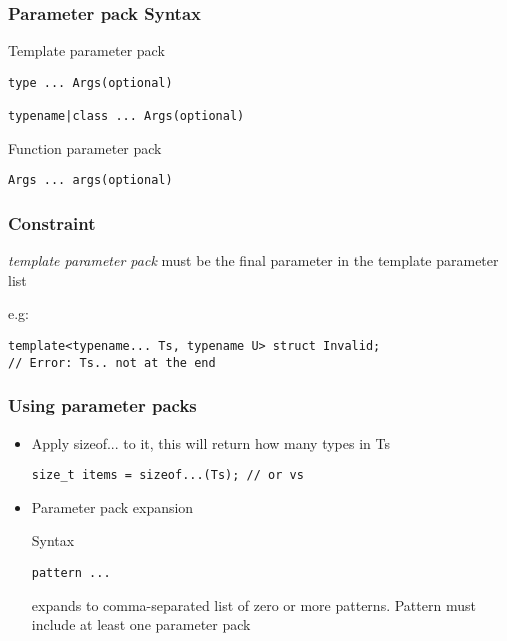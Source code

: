\documentclass{beamer}
\begin{document}
\begin{frame}[fragile]
\frametitle{Parameter pack Syntax}

\begin{block} {Template parameter pack}
\begin{lstlisting}
type ... Args(optional)

typename|class ... Args(optional)
\end{lstlisting}
\end{block}

\begin{block}{Function parameter pack}
\begin{lstlisting}
Args ... args(optional)
\end{lstlisting}
\end{block}

\end{frame}



\begin{frame}[fragile]
\frametitle{Constraint}

\textit{template parameter pack} must be the final parameter in the template parameter list 

\begin{block}{e.g:}
\begin{lstlisting}
template<typename... Ts, typename U> struct Invalid;
// Error: Ts.. not at the end
\end{lstlisting}
\end{block}
\end{frame}



\begin{frame}[fragile]
\frametitle{Using parameter packs}

\begin {itemize}
\item Apply sizeof... to it, this will return how many types in Ts
\begin{lstlisting}
size_t items = sizeof...(Ts); // or vs
\end{lstlisting}


\item {Parameter pack expansion}
\begin{block}{Syntax}
\begin{lstlisting}
pattern ...	
\end{lstlisting}
\end{block}
expands to comma-separated list of zero or more patterns.
Pattern must include at least one parameter pack
\end{itemize}

\end{frame}
\end{document}

